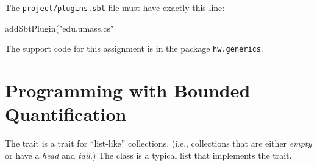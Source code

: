 \documentclass{book}
\begin{document}
The \texttt{project/plugins.sbt} file must have exactly this line:

\begin{scalacode}
addSbtPlugin("edu.umass.cs" %
\end{scalacode}

The support code for this assignment is in the package \texttt{hw.generics}.

\section{Programming with Bounded Quantification}

The trait  is a trait for ``list-like''
collections. (i.e., collections that are either \emph{empty} or have
a  \emph{head} and \emph{tail}.) The class 
is a typical list that implements the  trait.
\end{document}

